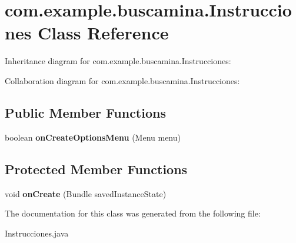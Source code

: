 \section{com.\-example.\-buscamina.\-Instrucciones Class Reference}
\label{classcom_1_1example_1_1buscamina_1_1_instrucciones}


Inheritance diagram for com.\-example.\-buscamina.\-Instrucciones\-:


Collaboration diagram for com.\-example.\-buscamina.\-Instrucciones\-:
\subsection*{Public Member Functions}
\begin{DoxyCompactItemize}
\item 
boolean {\bfseries on\-Create\-Options\-Menu} (Menu menu)\label{classcom_1_1example_1_1buscamina_1_1_instrucciones_a2a3ff453cfa6d749ce10a989b8628055}

\end{DoxyCompactItemize}
\subsection*{Protected Member Functions}
\begin{DoxyCompactItemize}
\item 
void {\bfseries on\-Create} (Bundle saved\-Instance\-State)\label{classcom_1_1example_1_1buscamina_1_1_instrucciones_aa40b477a496c191f2bf291e973ad4297}

\end{DoxyCompactItemize}


The documentation for this class was generated from the following file\-:\begin{DoxyCompactItemize}
\item 
Instrucciones.\-java\end{DoxyCompactItemize}
